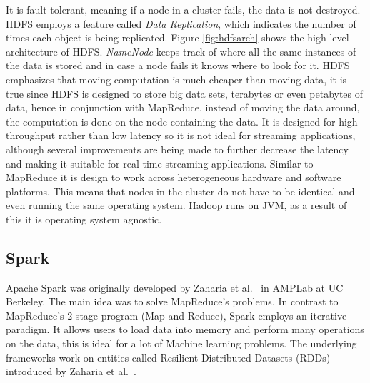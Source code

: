 \documentclass[english]{tktltiki}
\begin{document}
It is fault tolerant, meaning if a node in a cluster fails, the data is not destroyed. 
HDFS employs a feature called \textit{Data Replication}, which indicates the number of times each object is being replicated. 
Figure \ref{fig:hdfsarch} shows the high level architecture of HDFS. 
\textit{NameNode} keeps track of where all the same instances of the data is stored and in case a node fails it knows where to look for it. HDFS emphasizes that moving computation is much cheaper than moving data, it is true since HDFS is designed to store big data sets, terabytes or even petabytes of data, hence in conjunction with MapReduce, instead of moving the data around, the computation is done on the node containing the data. 
It is designed for high throughput rather than low latency so it is not ideal for streaming applications, although several improvements are being made to further decrease the latency and making it suitable for real time streaming applications. 
Similar to MapReduce it is design to work across heterogeneous hardware and software platforms. 
This means that nodes in the cluster do not have to be identical and even running the same operating system. 
Hadoop runs on JVM, as a result of this it is operating system agnostic.

\subsection{Spark}
Apache Spark  was originally developed by Zaharia et al.\ \cite{zaharia10} in AMPLab at UC Berkeley. 
The main idea was to solve MapReduce's problems. 
In contrast to MapReduce's 2 stage program (Map and Reduce), Spark employs an iterative paradigm. 
It allows users to load data into memory and perform many operations on the data, this is ideal for a lot of Machine learning problems. 
The underlying frameworks work on entities called Resilient Distributed Datasets (RDDs) introduced by Zaharia et al.\ \cite{zaharia12}. 
\end{document}
